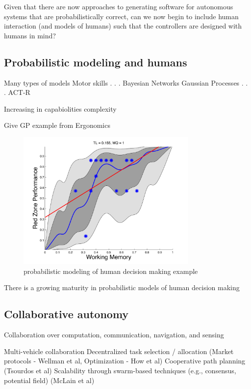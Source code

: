 Given that there are now approaches to generating software for autonomous systems that are probabilistically correct, can we now begin to include human interaction (and models of humans) such that the controllers are designed with humans in mind?

\subsection*{Probabilistic modeling and humans}

Many types of models
Motor skills
     .
     .
     .
Bayesian Networks
Gaussian Processes
     .
     .
     .
ACT-R

Increasing in capabiolities complexity

Give GP example from Ergonomics


\begin{figure}[h] 
   \centering
   \includegraphics[width=3.5in]{GP-fig.pdf} 
   \caption{probabilistic modeling of human decision making example}
   \label{fig:prob-humans}
\end{figure}

There is a growing maturity in probabilistic models of human decision making


\subsection*{Collaborative autonomy}

Collaboration over computation, communication, navigation, and sensing

Multi-vehicle collaboration 
Decentralized task selection / allocation (Market protocols - Wellman et al, Optimization - How et al) 
Cooperative path planning (Tsourdos et al)
Scalability through swarm-based techniques (e.g., consensus, potential field)  (McLain et al)

